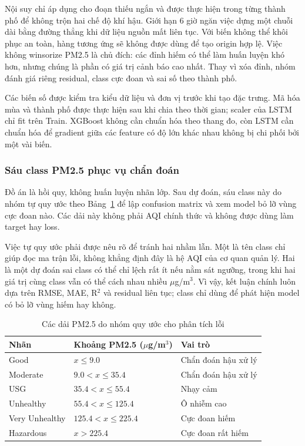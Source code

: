 \documentclass[11pt,a4paper]{article}
\newcommand{\unitpm}{$\mu$g/m$^3$}
\begin{document}
Nội suy chỉ áp dụng cho đoạn thiếu ngắn và được thực hiện trong từng thành phố để không trộn hai chế độ khí hậu. Giới hạn 6 giờ ngăn việc dựng một chuỗi dài bằng đường thẳng khi dữ liệu nguồn mất liên tục. Với biến không thể khôi phục an toàn, hàng tương ứng sẽ không được dùng để tạo origin hợp lệ. Việc không winsorize PM2.5 là chủ đích: các đỉnh hiếm có thể làm huấn luyện khó hơn, nhưng chúng là phần có giá trị cảnh báo cao nhất. Thay vì xóa đỉnh, nhóm đánh giá riêng residual, class cực đoan và sai số theo thành phố.

Các biến số được kiểm tra kiểu dữ liệu và đơn vị trước khi tạo đặc trưng. Mã hóa mùa và thành phố được thực hiện sau khi chia theo thời gian; scaler của LSTM chỉ fit trên Train. XGBoost không cần chuẩn hóa theo thang đo, còn LSTM cần chuẩn hóa để gradient giữa các feature có độ lớn khác nhau không bị chi phối bởi một vài biến.

\subsubsection{Sáu class PM2.5 phục vụ chẩn đoán}
Đồ án là hồi quy, không huấn luyện nhãn lớp. Sau dự đoán, sáu class này do nhóm tự quy ước theo Bảng~\ref{tab:class} để lập confusion matrix và xem model bỏ lỡ vùng cực đoan nào. Các dải này không phải AQI chính thức và không được dùng làm target hay loss.

Việc tự quy ước phải được nêu rõ để tránh hai nhầm lẫn. Một là tên class chỉ giúp đọc ma trận lỗi, không khẳng định đây là hệ AQI của cơ quan quản lý. Hai là một dự đoán sai class có thể chỉ lệch rất ít nếu nằm sát ngưỡng, trong khi hai giá trị cùng class vẫn có thể cách nhau nhiều \unitpm. Vì vậy, kết luận chính luôn dựa trên RMSE, MAE, R$^2$ và residual liên tục; class chỉ dùng để phát hiện model có bỏ lỡ vùng hiếm hay không.

\begin{table}[H]
\centering\small
\caption{Các dải PM2.5 do nhóm quy ước cho phân tích lỗi}
\label{tab:class}
\begin{tabular}{lll}
\toprule
Nhãn & Khoảng PM2.5 (\unitpm) & Vai trò\\
\midrule
Good & $x\leq9.0$ & Chẩn đoán hậu xử lý\\
Moderate & $9.0<x\leq35.4$ & Chẩn đoán hậu xử lý\\
USG & $35.4<x\leq55.4$ & Nhạy cảm\\
Unhealthy & $55.4<x\leq125.4$ & Ô nhiễm cao\\
Very Unhealthy & $125.4<x\leq225.4$ & Cực đoan hiếm\\
Hazardous & $x>225.4$ & Cực đoan rất hiếm\\
\bottomrule
\end{tabular}
\end{table}
\end{document}
